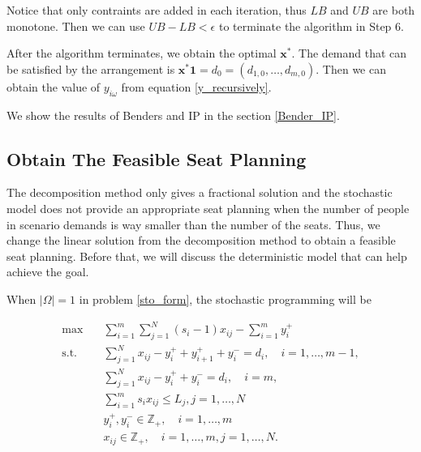 \begin{remark}
  Notice that only contraints are added in each iteration, thus $LB$ and $UB$ are both monotone. Then we can use $UB - LB < \epsilon$ to terminate the algorithm in Step 6.
\end{remark}


After the algorithm terminates, we obtain the optimal $\mathbf{x}^{*}$. The demand that can be satisfied by the arrangement is $\mathbf{x}^{*} \mathbf{1} = d_0 = (d_{1,0},\ldots,d_{m,0})$.
Then we can obtain the value of $y_{i \omega}$ from equation \eqref{y_recursively}.

We show the results of Benders and IP in the section \ref{Bender_IP}.

\subsection{Obtain The Feasible Seat Planning}\label{seat_assignment}
The decomposition method only gives a fractional solution and the stochastic model does not provide an appropriate seat planning when the number of people in scenario demands is way smaller than the number of the seats. Thus, we change the linear solution from the decomposition method to obtain a feasible seat planning. Before that, we will discuss the deterministic model that can help achieve the goal. 


When $|\Omega| =1$ in problem \eqref{sto_form}, the stochastic programming will be 

\begin{equation}\label{one_form}
  \begin{aligned}
  \max \quad & \sum_{i=1}^{m}  \sum_{j= 1}^{N} (s_i-1) x_{ij} - \sum_{i=1}^{m} y_{i}^{+}  \\
  \text {s.t.} \quad & \sum_{j= 1}^{N} x_{ij} - y_{i}^{+}+ y_{i+1}^{+} + y_{i}^{-} = d_{i}, \quad i =1,\ldots,m-1, \\
  & \sum_{j= 1}^{N} x_{ij} -y_{i}^{+} + y_{i}^{-} = d_{i}, \quad i = m, \\
  & \sum_{i=1}^{m} s_{i} x_{ij} \leq L_j, j =1,\ldots, N\\
  & y_{i}^{+}, y_{i}^{-} \in \mathbb{Z}_{+}, \quad i = 1,\ldots,m \\
  & x_{ij} \in \mathbb{Z}_{+}, \quad i=1,\ldots,m, j = 1,\ldots,N.
  \end{aligned}
\end{equation}

